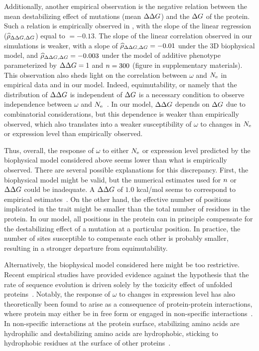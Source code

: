 Additionally, another empirical observation is the negative relation between the mean destabilizing effect of mutations (mean $\Delta \Delta G$) and the $\Delta G$ of the protein.
Such a relation is empirically observed in \citet{Serohijos2012}, with the slope of the linear regression ($\widehat{\rho}_{\Delta \Delta G, \Delta G}$) equal to $ = -0.13$.
The slope of the linear correlation observed in our simulations is weaker, with a slope of $\widehat{\rho}_{\Delta \Delta G, \Delta G} = -0.01$ under the 3D biophysical model, and $\widehat{\rho}_{\Delta \Delta G, \Delta G} = -0.003$ under the model of additive phenotype parameterized by $\Delta \Delta G = 1$ and $n=300$ (figure \label{fig:DG-vs-DDG} in supplementary materials).
This observation also sheds light on the correlation between $\omega$ and $N_{\text{e}}$ in empirical data and in our model.
Indeed, equimutability, or namely that the distribution of $\Delta \Delta G$ is independent of $\Delta G$ is a necessary condition to observe independence between $\omega$ and $N_{\text{e}}$~\citep{Cherry1998}.
In our model, $\Delta \Delta G$ depends on $\Delta G$ due to combinatorial considerations, but this dependence is weaker than empirically observed, which also translates into a weaker susceptibility of $\omega$ to changes in $N_{\text{e}}$ or expression level than empirically observed.

Thus, overall, the response of $\omega$ to either $N_{\text{e}}$ or expression level predicted by the biophysical model considered above seems lower than what is empirically observed.
There are several possible explanations for this discrepancy.
First, the biophysical model might be valid, but the numerical estimates used for $n$ or $\Delta \Delta G$ could be inadequate.
A $\Delta \Delta G$ of $1.0$ kcal/mol seems to correspond to empirical estimates~\citep{Zeldovich2007}.
On the other hand, the effective number of positions implicated in the trait might be smaller than the total number of residues in the protein.
In our model, all positions in the protein can in principle compensate for the destabilizing effect of a mutation at a particular position.
In practice, the number of sites susceptible to compensate each other is probably smaller, resulting in a stronger departure from equimutability.

Alternatively, the biophysical model considered here might be too restrictive.
Recent empirical studies have provided evidence against the hypothesis that the rate of sequence evolution is driven solely by the toxicity effect of unfolded proteins~\citep{Plata2017,Razban2019,Biesiadecka2020}.
Notably, the response of $\omega$ to changes in expression level has also theoretically been found to arise as a consequence of protein-protein interactions, where protein may either be in free form or engaged in non-specific interactions~\citep{Yang2012, Zhang2013}.
In non-specific interactions at the protein surface, stabilizing amino acids are hydrophilic and destabilizing amino acids are hydrophobic, sticking to hydrophobic residues at the surface of other proteins~\citep{Dixit2013,Manhart2015}.

